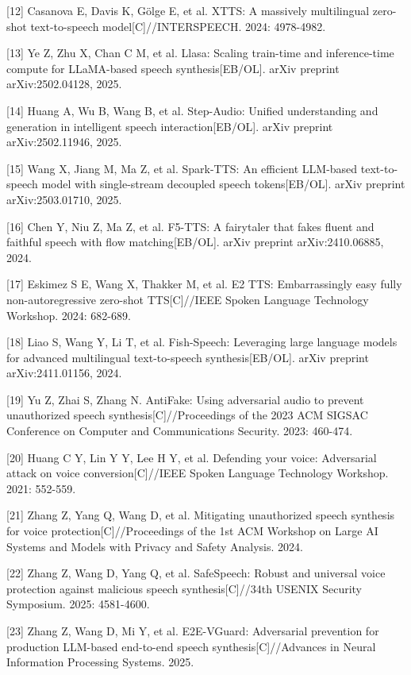 \begin{referencesblock}
{[}12{]} Casanova E, Davis K, Gölge E, et al. XTTS: A massively
multilingual zero-shot text-to-speech model{[}C{]}//INTERSPEECH. 2024:
4978-4982.

{[}13{]} Ye Z, Zhu X, Chan C M, et al. Llasa: Scaling train-time and
inference-time compute for LLaMA-based speech synthesis{[}EB/OL{]}.
arXiv preprint arXiv:2502.04128, 2025.

{[}14{]} Huang A, Wu B, Wang B, et al. Step-Audio: Unified understanding
and generation in intelligent speech interaction{[}EB/OL{]}. arXiv
preprint arXiv:2502.11946, 2025.

{[}15{]} Wang X, Jiang M, Ma Z, et al. Spark-TTS: An efficient LLM-based
text-to-speech model with single-stream decoupled speech
tokens{[}EB/OL{]}. arXiv preprint arXiv:2503.01710, 2025.

{[}16{]} Chen Y, Niu Z, Ma Z, et al. F5-TTS: A fairytaler that fakes
fluent and faithful speech with flow matching{[}EB/OL{]}. arXiv preprint
arXiv:2410.06885, 2024.

{[}17{]} Eskimez S E, Wang X, Thakker M, et al. E2 TTS: Embarrassingly
easy fully non-autoregressive zero-shot TTS{[}C{]}//IEEE Spoken Language
Technology Workshop. 2024: 682-689.

{[}18{]} Liao S, Wang Y, Li T, et al. Fish-Speech: Leveraging large
language models for advanced multilingual text-to-speech
synthesis{[}EB/OL{]}. arXiv preprint arXiv:2411.01156, 2024.

{[}19{]} Yu Z, Zhai S, Zhang N. AntiFake: Using adversarial audio to
prevent unauthorized speech synthesis{[}C{]}//Proceedings of the 2023
ACM SIGSAC Conference on Computer and Communications Security. 2023:
460-474.

{[}20{]} Huang C Y, Lin Y Y, Lee H Y, et al. Defending your voice:
Adversarial attack on voice conversion{[}C{]}//IEEE Spoken Language
Technology Workshop. 2021: 552-559.

{[}21{]} Zhang Z, Yang Q, Wang D, et al. Mitigating unauthorized speech
synthesis for voice protection{[}C{]}//Proceedings of the 1st ACM
Workshop on Large AI Systems and Models with Privacy and Safety
Analysis. 2024.

{[}22{]} Zhang Z, Wang D, Yang Q, et al. SafeSpeech: Robust and
universal voice protection against malicious speech
synthesis{[}C{]}//34th USENIX Security Symposium. 2025: 4581-4600.

{[}23{]} Zhang Z, Wang D, Mi Y, et al. E2E-VGuard: Adversarial
prevention for production LLM-based end-to-end speech
synthesis{[}C{]}//Advances in Neural Information Processing Systems.
2025.


\end{referencesblock}
